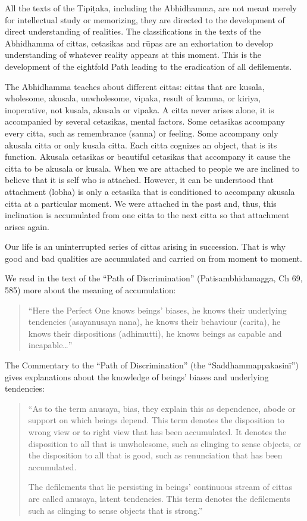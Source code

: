 All the texts of the Tipiṭaka, including the Abhidhamma, are not meant merely for intellectual study or memorizing, they are directed to the development of direct understanding of realities. The classifications in the texts of the Abhidhamma of cittas, 
cetasikas and rūpas are an exhortation to develop understanding of whatever reality 
appears at this moment. This is the development of the eightfold Path leading to the 
eradication of all defilements. 

The Abhidhamma teaches about different cittas: cittas that are kusala, wholesome, 
akusala, unwholesome, vipaka, result of kamma, or kiriya, inoperative, not kusala, 
akusala or vipaka. A citta never arises alone, it is accompanied by several cetasikas, 
mental factors. Some cetasikas accompany every citta, such as remembrance (sanna) 
or feeling. Some accompany only akusala citta or only kusala citta. Each citta cognizes an object, that is its function. Akusala cetasikas or beautiful cetasikas that accompany it cause the citta to be akusala or kusala. When we are attached to people 
we are inclined to believe that it is self who is attached. However, it can be understood that attachment (lobha) is only a cetasika that is conditioned to accompany akusala citta at a particular moment. We were attached in the past and, thus, this inclination is accumulated from one citta to the next citta so that attachment arises again. 

Our life is an uninterrupted series of cittas arising in succession. That is why good 
and bad qualities are accumulated and carried on from moment to moment. 

We read in the text of the ``Path of Discrimination'' (Patisambhidamagga, Ch 69, 585) 
more about the meaning of accumulation: 
\begin{quote}
``Here the Perfect One knows beings’ biases, he knows their underlying tendencies (asayanusaya nana), he knows their behaviour 
(carita), he knows their dispositions (adhimutti), he knows beings as 
capable and incapable\ldots ''
\end{quote}
The Commentary to the ``Path of Discrimination'' (the ``Saddhammappakasinī'') gives 
explanations about the knowledge of beings’ biases and underlying tendencies: 
\begin{quote}
``As to the term anusaya, bias, they explain this as dependence, abode or 
support on which beings depend. This term denotes the disposition to 
wrong view or to right view that has been accumulated. It denotes the 
disposition to all that is unwholesome, such as clinging to sense objects, or the disposition to all that is good, such as renunciation that 
has been accumulated. 


The defilements that lie persisting in beings’ continuous stream of cittas are called anusaya, latent tendencies. This term denotes the defilements such as clinging to sense objects that is strong.'' 
\end{quote}

